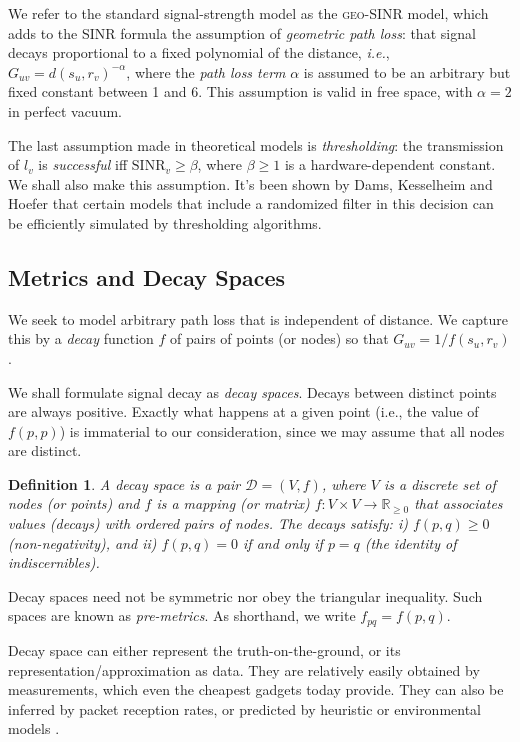 \documentclass[11pt]{amsart}
\newtheorem{definition}{Definition}[section]
\def\calD{{\mathcal{D}}}
\newcommand{\reals}{\mathbb{R}}
\newcommand{\geomodel}{\textsc{geo-SINR}}
\begin{document}
We refer to the standard signal-strength model as the {\geomodel} model, which 
adds to the SINR formula the assumption of \emph{geometric path loss}:
that signal decays proportional to a fixed polynomial of the distance, 
\emph{i.e.}, 
$G_{uv} = d(s_u, r_v)^{-\alpha}$,
 where the \emph{path loss term} $\alpha$ is assumed to be an
 arbitrary but fixed constant between 1 and 6.  
This assumption is valid in free space, with $\alpha=2$ in perfect vacuum.  

The last assumption made in theoretical models is \emph{thresholding}:
the transmission of $l_v$ is \emph{successful} iff $\text{SINR}_v
\ge \beta$, where $\beta \ge 1$ is a hardware-dependent constant.  We shall
also make this assumption. It's been shown by Dams, Kesselheim and
Hoefer \cite{Dams2012} that certain models that include a randomized
filter in this decision can be efficiently simulated by thresholding
algorithms.

\subsection{Metrics and Decay Spaces}
\label{sec:decayspaces}

We seek to model arbitrary path loss that is independent of distance.
We capture this by a \emph{decay} function $f$ of pairs of points (or
nodes) so that $G_{uv} = 1/f(s_u, r_v)$.

We shall formulate signal decay as \emph{decay spaces}.  Decays
between distinct points are always positive.  Exactly what happens at
a given point (i.e., the value of $f(p,p)$) is immaterial to our
consideration, since we may assume that all nodes are distinct.  



\begin{definition}
  A \emph{decay space} is a pair $\calD = (V,f)$, where $V$ is a
  discrete set of nodes (or points) and $f$ is a mapping (or matrix) $f:V\times V
  \rightarrow \reals_{\ge 0}$ that associates values (\emph{decays}) with
  ordered pairs of nodes.  The decays satisfy: i) $f(p,q) \ge 0$
  (non-negativity), and ii) $f(p,q)=0$ if and only if $p=q$ (the
  identity of indiscernibles).
\end{definition}

Decay spaces need not be symmetric nor obey the triangular inequality.
Such spaces are known as \emph{pre-metrics}.
As shorthand, we write $f_{pq} = f(p,q)$.



Decay space can either represent the truth-on-the-ground, or
its representation/approximation as data. They are relatively easily obtained by measurements, which even the cheapest gadgets today provide. 
They can also be inferred by packet reception rates, or predicted by heuristic  or environmental models \cite{Goldsmith}.
\end{document}
